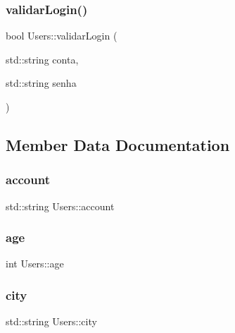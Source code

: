 \mbox{\label{class_users_a5154215af21dcf9ec542b125f96f7000}} 
\subsubsection{\texorpdfstring{validar\+Login()}{validarLogin()}}
{\footnotesize\ttfamily bool Users\+::validar\+Login (\begin{DoxyParamCaption}\item[{std\+::string}]{conta,  }\item[{std\+::string}]{senha }\end{DoxyParamCaption})}



\subsection{Member Data Documentation}
\mbox{\label{class_users_a87b8bab72f85ca29b666142ae23dbc3c}} 
\subsubsection{\texorpdfstring{account}{account}}
{\footnotesize\ttfamily std\+::string Users\+::account\hspace{0.3cm}{\ttfamily [private]}}

\mbox{\label{class_users_a7a1ab9517587c920030c67222c2e1973}} 
\subsubsection{\texorpdfstring{age}{age}}
{\footnotesize\ttfamily int Users\+::age\hspace{0.3cm}{\ttfamily [private]}}

\mbox{\label{class_users_ade0a0b1fbc7d0c7a2c131ab211d4b3f6}} 
\subsubsection{\texorpdfstring{city}{city}}
{\footnotesize\ttfamily std\+::string Users\+::city\hspace{0.3cm}{\ttfamily [private]}}

